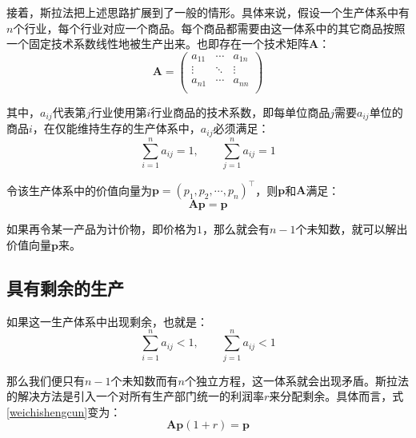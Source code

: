 接着，斯拉法把上述思路扩展到了一般的情形\cite[5-6]{SiLaFaYongShangPinShengChanShangPinJingJiLiLunPiPanXuLun1963}\cite[189-190]{CaiJiMingCongGuDianZhengZhiJingJiXueDaoZhongGuoTeSeSheHuiZhuYiZhengZhiJingJiXueJiYuZhongGuoShiJiaoDeZhengZhiJingJiXueYanBianShangCe2023}。具体来说，假设一个生产体系中有$n$个行业，每个行业对应一个商品。每个商品都需要由这一体系中的其它商品按照一个固定技术系数线性地被生产出来。也即存在一个技术矩阵$\bm{A}$：
\begin{equation}
    \bm{A} =
    \begin{pmatrix}
    a_{11} & \cdots & a_{1n} \\
    \vdots & \ddots & \vdots \\
    a_{n1} & \cdots & a_{nn} \\
    \end{pmatrix}
\end{equation}

其中，$a_{ij}$代表第$j$行业使用第$i$行业商品的技术系数，即每单位商品$j$需要$a_{ij}$单位的商品$i$，在仅能维持生存的生产体系中，$a_{ij}$必须满足：
\begin{equation}
    \sum_{i=1}^{n} a_{ij} = 1,\qquad \sum_{j=1}^{n}a_{ij} = 1
\end{equation}

令该生产体系中的价值向量为$\bm{p} = \left( p_1, p_2, \cdots, p_n \right)^\top$，则$\bm{p}$和$\bm{A}$满足：
\begin{equation}
    \label{weichishengcun}
    \bm{A} \bm{p} = \bm{p}
\end{equation}

如果再令某一产品为计价物，即价格为$1$，那么就会有$n-1$个未知数，就可以解出价值向量$\bm{p}$来。

\subsection{具有剩余的生产}

如果这一生产体系中出现剩余，也就是\cite[190]{CaiJiMingCongGuDianZhengZhiJingJiXueDaoZhongGuoTeSeSheHuiZhuYiZhengZhiJingJiXueJiYuZhongGuoShiJiaoDeZhengZhiJingJiXueYanBianShangCe2023}：
\begin{equation}
    \sum_{i=1}^{n} a_{ij} < 1,\qquad \sum_{j=1}^{n}a_{ij} < 1
\end{equation}

那么我们便只有$n-1$个未知数而有$n$个独立方程，这一体系就会出现矛盾。斯拉法的解决方法是引入一个对所有生产部门统一的利润率$r$来分配剩余\cite[7]{SiLaFaYongShangPinShengChanShangPinJingJiLiLunPiPanXuLun1963}。具体而言，式\ref{weichishengcun}变为：
\begin{equation}
    \bm{A} \bm{p} \left( 1 + r \right)= \bm{p}
\end{equation}

